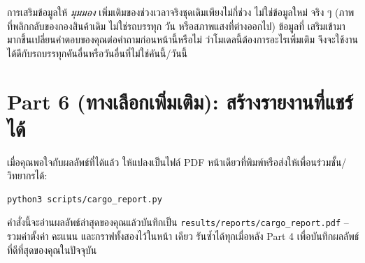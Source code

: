 \documentclass[11pt]{article}
\begin{document}
\begin{notebox}
การเสริมข้อมูลให้ \emph{มุมมอง} เพิ่มเติมของช่วงเวลาจริงชุดเดิมเพียงไม่กี่ช่วง ไม่ใช่ข้อมูลใหม่
จริง ๆ (ภาพที่พลิกกลับของกองสินค้าเดิม ไม่ใช่รถบรรทุก วัน หรือสภาพแสงที่ต่างออกไป) ข้อมูลที่
เสริมเข้ามามากขึ้นเปลี่ยนคำตอบของคุณต่อคำถามก่อนหน้านี้หรือไม่ ว่าโมเดลนี้ต้องการอะไรเพิ่มเติม
จึงจะใช้งานได้ดีกับรถบรรทุกคันอื่นหรือวันอื่นที่ไม่ใช่คันนี้/วันนี้
\end{notebox}

\section*{Part 6 (ทางเลือกเพิ่มเติม): สร้างรายงานที่แชร์ได้}
เมื่อคุณพอใจกับผลลัพธ์ที่ได้แล้ว ให้แปลงเป็นไฟล์ PDF หน้าเดียวที่พิมพ์หรือส่งให้เพื่อนร่วมชั้น/
วิทยากรได้:
\begin{lstlisting}
python3 scripts/cargo_report.py
\end{lstlisting}
คำสั่งนี้จะอ่านผลลัพธ์ล่าสุดของคุณแล้วบันทึกเป็น
\texttt{results/reports/cargo\_report.pdf} -- รวมค่าตั้งค่า คะแนน และกราฟทั้งสองไว้ในหน้า
เดียว รันซ้ำได้ทุกเมื่อหลัง Part 4 เพื่อบันทึกผลลัพธ์ที่ดีที่สุดของคุณในปัจจุบัน
\end{document}
